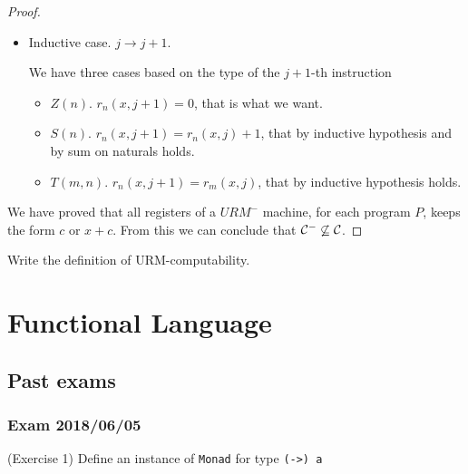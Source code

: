 \documentclass[12pt,a4paper,oneside]{book}
\begin{document}
\begin{exercise}
\begin{proof}
\begin{itemize}
            \item Inductive case. $j \to j + 1$.

            We have three cases based on the type of the $j+1$-th
            instruction
            \begin{itemize}
                \item $Z(n)$. $r_n(x, j+1) = 0$, that is what we want.
                \item $S(n)$. $r_n(x, j+1) = r_n(x, j) + 1$, that by
                  inductive hypothesis and by sum on naturals holds.
                \item $T(m, n)$. $r_n(x, j + 1) = r_m(x, j)$, that by
                  inductive hypothesis holds.
            \end{itemize}
        \end{itemize}

        We have proved that all registers of a $URM^-$ machine, for
        each program $P$, keeps the form $c$ or $x + c$. From this we
        can conclude that $\mathcal{C}^- \not\subseteq \mathcal{C}$.
    \end{proof}

\end{exercise}

\begin{exercise}
    Write the definition of URM-computability.
\end{exercise}



\chapter{Functional Language}

\section{Past exams}

\subsection{Exam 2018/06/05}

\begin{exercise}{(Exercise 1)}
	Define an instance of \texttt{Monad} for type \texttt{(->) a}
\end{exercise}
\end{document}
